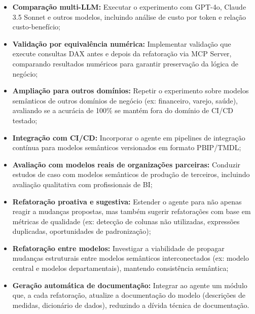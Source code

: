 \documentclass[
    12pt,               %
    openright,          %
    oneside,            %
    a4paper,            %
    chapter=TITLE,      %
    section=TITLE,      %
    brazil              %
]{abntex2}
\begin{document}
\begin{itemize}
    \item \textbf{Comparação multi-LLM:} Executar o experimento com GPT-4o, Claude 3.5 Sonnet e outros modelos, incluindo análise de custo por token e relação custo-benefício;
    \item \textbf{Validação por equivalência numérica:} Implementar validação que execute consultas DAX antes e depois da refatoração via MCP Server, comparando resultados numéricos para garantir preservação da lógica de negócio;
    \item \textbf{Ampliação para outros domínios:} Repetir o experimento sobre modelos semânticos de outros domínios de negócio (ex: financeiro, varejo, saúde), avaliando se a acurácia de 100\% se mantém fora do domínio de CI/CD testado;
    \item \textbf{Integração com CI/CD:} Incorporar o agente em pipelines de integração contínua para modelos semânticos versionados em formato PBIP/TMDL;
    \item \textbf{Avaliação com modelos reais de organizações parceiras:} Conduzir estudos de caso com modelos semânticos de produção de terceiros, incluindo avaliação qualitativa com profissionais de BI;
    \item \textbf{Refatoração proativa e sugestiva:} Estender o agente para não apenas reagir a mudanças propostas, mas também sugerir refatorações com base em métricas de qualidade (ex: detecção de colunas não utilizadas, expressões duplicadas, oportunidades de padronização);
    \item \textbf{Refatoração entre modelos:} Investigar a viabilidade de propagar mudanças estruturais entre modelos semânticos interconectados (ex: modelo central e modelos departamentais), mantendo consistência semântica;
    \item \textbf{Geração automática de documentação:} Integrar ao agente um módulo que, a cada refatoração, atualize a documentação do modelo (descrições de medidas, dicionário de dados), reduzindo a dívida técnica de documentação.
\end{itemize}

\postextual



\begin{apendicesenv}




\end{apendicesenv}

\end{document}
